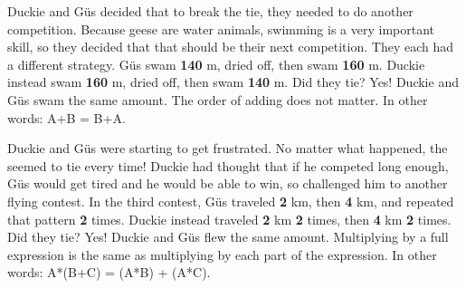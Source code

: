 {Duckie and Güs decided that to break the tie, they needed to do another competition. \linebreak Because geese are water animals, swimming is a very important skill, so they decided that that should be their next competition. They each had a different strategy. Güs swam \textbf{140} m, dried off, then swam \textbf{160} m. Duckie instead swam \textbf{160} m, dried off, then swam \textbf{140} m. Did they tie?}
{Yes! Duckie and Güs swam the same amount.}
{The order of adding does not matter. In other words: A+B = B+A.}
{}
{Duckie and Güs were starting to get frustrated. No matter what happened, the seemed to tie every time! Duckie had thought that if he competed long enough, Güs would get tired and he would be able to win, so challenged him to another flying contest. In the third contest, Güs traveled \textbf{2} km, then \textbf{4} km, and repeated that pattern \textbf{2} times. Duckie instead traveled \textbf{2} km \textbf{2} times, then \textbf{4} km \textbf{2} times. Did they tie?}
{Yes! Duckie and Güs flew the same amount.}
{Multiplying by a full expression is the same as multiplying by each part of the expression. In other words: A*(B+C) = (A*B) + (A*C).}
